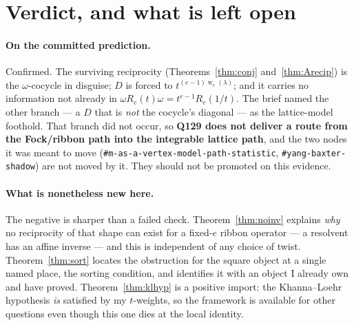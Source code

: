 \documentclass[11pt]{article}
\theoremstyle{definition}
\theoremstyle{remark}
\newcommand{\wgt}{\operatorname{w}}
\begin{document}
\section{Verdict, and what is left open}\label{sec:verdict}

\paragraph{On the committed prediction.}  Confirmed.  The surviving reciprocity
(Theorems~\ref{thm:conj} and~\ref{thm:Arecip}) is the $\omega$-cocycle in disguise; $D$ is
forced to $t^{(e-1)\wgt_e(\lambda)}$; and it carries no information not already in
$\omega R_e(t)\omega=t^{e-1}R_e(1/t)$.  The brief named the other branch --- a $D$ that is
\emph{not} the cocycle's diagonal --- as the lattice-model foothold.  That branch did not
occur, so \textbf{Q129 does not deliver a route from the Fock/ribbon path into the integrable
lattice path}, and the two nodes it was meant to move
(\texttt{\#m-as-a-vertex-model-path-statistic}, \texttt{\#yang-baxter-shadow}) are not moved by
it.  They should not be promoted on this evidence.

\paragraph{What is nonetheless new here.}  The negative is sharper than a failed check.
Theorem~\ref{thm:noinv} explains \emph{why} no reciprocity of that shape can exist for a
fixed-$e$ ribbon operator --- a resolvent has an affine inverse --- and this is independent of
any choice of twist.  Theorem~\ref{thm:sort} locates the obstruction for the square object at
a single named place, the sorting condition, and identifies it with an object I already
own and have proved.  Theorem~\ref{thm:klhyp} is a positive import: the Khanna--Loehr
hypothesis \emph{is} satisfied by my $t$-weights, so the framework is available for other
questions even though this one dies at the local identity.
\end{document}
